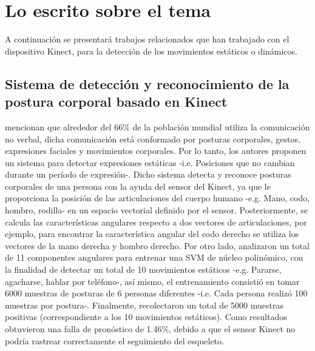 \newpage 
\section{Lo escrito sobre el tema} \label{tr}
A continuaci\'on se presentar\'a trabajos relacionados que han trabajado con el dispositivo Kinect, para la detecci\'on de los movimientos est\'aticos o din\'amicos.
\subsection{Sistema de detecci\'on y reconocimiento de la postura corporal basado en Kinect} \label{tr:1}
 mencionan que alrededor del 66\% de la poblaci\'on mundial utiliza la comunicaci\'on no verbal, dicha comunicaci\'on est\'a conformado por posturas corporales, gestos, expresiones faciales y movimientos corporales. Por lo tanto, los autores proponen un sistema para detectar expresiones est\'aticas -i.e. Posiciones que no cambian durante un per\'iodo de expresi\'on-.
\medbreak
Dicho sistema detecta y reconoce posturas corporales de una persona con la ayuda del sensor del Kinect, ya que le proporciona la posici\'on de las articulaciones del cuerpo humano -e.g. Mano, codo, hombro, rodilla- en un espacio vectorial definido por el sensor. Posteriormente, se calcula las caracter\'isticas angulares respecto a dos vectores de articulaciones, por ejemplo, para encontrar la caracter\'istica angular del codo derecho se utiliza los vectores de la mano derecha y hombro derecho.
\medbreak
Por otro lado,  analizaron un total de 11 componentes angulares para entrenar una \acrfull{SVM} de n\'ucleo polin\'omico, con la finalidad de detectar un total de 10 movimientos est\'aticos -e.g. Pararse, agacharse, hablar por tel\'efono-, as\'i mismo, el entrenamiento consisti\'o en tomar 6000 muestras de posturas de 6 personas diferentes -i.e. Cada persona realiz\'o 100 muestras por postura-.
\medbreak
Finalmente,  recolectaron un total de 5000 muestras positivas (correspondiente a los 10 movimientos est\'aticos).  Como resultados obtuvieron una falla de pron\'ostico de 1.46\%, debido a que el sensor Kinect no podr\'ia rastrear correctamente el seguimiento del esqueleto.
